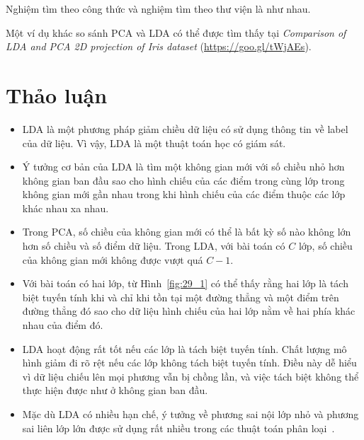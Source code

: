 Nghiệm tìm theo công thức và nghiệm tìm theo thư viện là như nhau.

Một ví dụ khác so sánh PCA và LDA có thể được tìm thấy tại \textit{Comparison of LDA
and PCA 2D projection of Iris dataset} (\url{https://goo.gl/tWjAEs}).

\newpage
\section{Thảo luận}

\begin{itemize}
\item LDA là một phương pháp giảm chiều dữ liệu có sử dụng thông tin về
label của dữ liệu. Vì vậy, LDA là một thuật toán học có giám sát.

\item Ý tưởng cơ bản của LDA là tìm một không gian mới với số chiều nhỏ hơn
không gian ban đầu sao cho hình chiếu của các điểm trong cùng lớp trong không gian mới gần nhau trong khi hình chiếu của các điểm thuộc các lớp khác
nhau xa nhau.

\item Trong PCA, số chiều của không gian mới có thể là bất kỳ số nào không lớn hơn số chiều và số điểm dữ liệu. Trong LDA, với bài toán có $C$
lớp, số chiều của không gian mới không được vượt quá $C-1$.

\item Với bài toán có hai lớp, từ Hình~\ref{fig:29_1} có thể thấy rằng
hai lớp
là tách biệt tuyến tính khi và chỉ khi tồn tại một đường thẳng và một điểm
trên đường thẳng đó sao cho dữ liệu hình chiếu của hai lớp nằm về hai phía khác nhau của điểm đó.

\item LDA hoạt động rất tốt nếu các lớp là tách biệt tuyến tính. Chất lượng mô
hình giảm đi rõ rệt nếu các lớp không tách biệt tuyến tính. Điều này dễ
hiểu vì dữ liệu chiếu lên mọi phương vẫn bị chồng lần, và việc
tách biệt không thể thực hiện được như ở không gian ban đầu.

\item Mặc dù LDA có nhiều hạn chế, ý tưởng về phương sai nội lớp nhỏ và phương sai liên lớp lớn được sử dụng rất nhiều trong các
thuật toán phân loại~\cite{vu2016fast,vu2016learning,Meng2011FDDL}.

\end{itemize}

